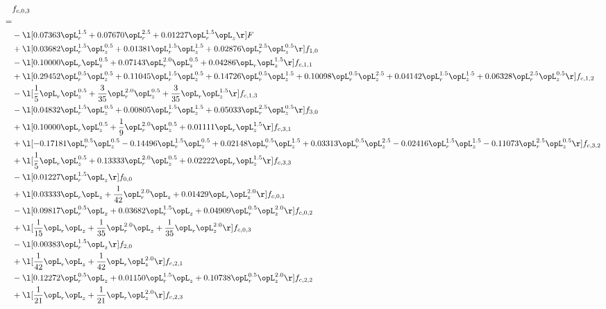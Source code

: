 \begin{alignat}{2} 
\label{eq:f_03_1} 
& f_{c,0,3} \nonumber \\ 
 = \\ 
& - \l[  0.07363 \opL_r^{1.5} +  0.07670 \opL_r^{2.5} +  0.01227 \opL_r^{1.5} \opL_z  \r] F \nonumber \\ 
& + \l[  0.03682 \opL_r^{1.5} \opL_z^{0.5} +  0.01381 \opL_r^{1.5} \opL_z^{1.5} +  0.02876 \opL_r^{2.5} \opL_z^{0.5}  \r] f_{1,0} \nonumber \\ 
& - \l[  0.10000 \opL_r \opL_z^{0.5} +  0.07143 \opL_r^{2.0} \opL_z^{0.5} +  0.04286 \opL_r \opL_z^{1.5}  \r] f_{c,1,1} \nonumber \\ 
& + \l[  0.29452 \opL_r^{0.5} \opL_z^{0.5} +  0.11045 \opL_r^{1.5} \opL_z^{0.5} +  0.14726 \opL_r^{0.5} \opL_z^{1.5} +  0.10098 \opL_r^{0.5} \opL_z^{2.5} +  0.04142 \opL_r^{1.5} \opL_z^{1.5} +  0.06328 \opL_r^{2.5} \opL_z^{0.5}  \r] f_{c,1,2} \nonumber \\ 
& - \l[ \frac{1}{5} \opL_r \opL_z^{0.5} + \frac{3}{35} \opL_r^{2.0} \opL_z^{0.5} + \frac{3}{35} \opL_r \opL_z^{1.5}  \r] f_{c,1,3} \nonumber \\ 
& - \l[  0.04832 \opL_r^{1.5} \opL_z^{0.5} +  0.00805 \opL_r^{1.5} \opL_z^{1.5} +  0.05033 \opL_r^{2.5} \opL_z^{0.5}  \r] f_{3,0} \nonumber \\ 
& + \l[  0.10000 \opL_r \opL_z^{0.5} + \frac{1}{9} \opL_r^{2.0} \opL_z^{0.5} +  0.01111 \opL_r \opL_z^{1.5}  \r] f_{c,3,1} \nonumber \\ 
& + \l[  -0.17181 \opL_r^{0.5} \opL_z^{0.5}   -0.14496 \opL_r^{1.5} \opL_z^{0.5} +  0.02148 \opL_r^{0.5} \opL_z^{1.5} +  0.03313 \opL_r^{0.5} \opL_z^{2.5}   -0.02416 \opL_r^{1.5} \opL_z^{1.5}   -0.11073 \opL_r^{2.5} \opL_z^{0.5}  \r] f_{c,3,2} \nonumber \\ 
& + \l[ \frac{1}{5} \opL_r \opL_z^{0.5} +  0.13333 \opL_r^{2.0} \opL_z^{0.5} +  0.02222 \opL_r \opL_z^{1.5}  \r] f_{c,3,3} \nonumber \\ 
& - \l[  0.01227 \opL_r^{1.5} \opL_z  \r] f_{0,0} \nonumber \\ 
& + \l[  0.03333 \opL_r \opL_z + \frac{1}{42} \opL_r^{2.0} \opL_z +  0.01429 \opL_r \opL_z^{2.0}  \r] f_{c,0,1} \nonumber \\ 
& - \l[  0.09817 \opL_r^{0.5} \opL_z +  0.03682 \opL_r^{1.5} \opL_z +  0.04909 \opL_r^{0.5} \opL_z^{2.0}  \r] f_{c,0,2} \nonumber \\ 
& + \l[ \frac{1}{15} \opL_r \opL_z + \frac{1}{35} \opL_r^{2.0} \opL_z + \frac{1}{35} \opL_r \opL_z^{2.0}  \r] f_{c,0,3} \nonumber \\ 
& - \l[  0.00383 \opL_r^{1.5} \opL_z  \r] f_{2,0} \nonumber \\ 
& + \l[ \frac{1}{42} \opL_r \opL_z + \frac{1}{42} \opL_r \opL_z^{2.0}  \r] f_{c,2,1} \nonumber \\ 
& - \l[  0.12272 \opL_r^{0.5} \opL_z +  0.01150 \opL_r^{1.5} \opL_z +  0.10738 \opL_r^{0.5} \opL_z^{2.0}  \r] f_{c,2,2} \nonumber \\ 
& + \l[ \frac{1}{21} \opL_r \opL_z + \frac{1}{21} \opL_r \opL_z^{2.0}  \r] f_{c,2,3} \nonumber \\ 
\end{alignat} 


